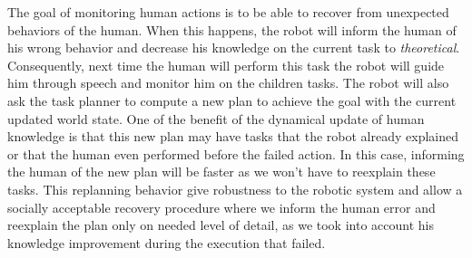 \documentclass{llncs}
\begin{document}
The goal of monitoring human actions is to be able to recover from unexpected behaviors of the human. When this happens, the robot will inform the human of his wrong behavior and decrease his knowledge on the current task to \textit{theoretical}. Consequently, next time the human will perform this task the robot will guide him through speech and monitor him on the children tasks.
The robot will also ask the task planner to compute a new plan to achieve the goal with the current updated world state.
One of the benefit of the dynamical update of human knowledge is that this new plan may have tasks that the robot already explained or that the human even performed before the failed action. In this case, informing the human of the new plan will be faster as we won't have to reexplain these tasks. 
This replanning behavior give robustness to the robotic system and allow a socially acceptable recovery procedure where we inform the human error and reexplain the plan only on needed level of detail, as we took into account his knowledge improvement during the execution that failed.




\end{document}
